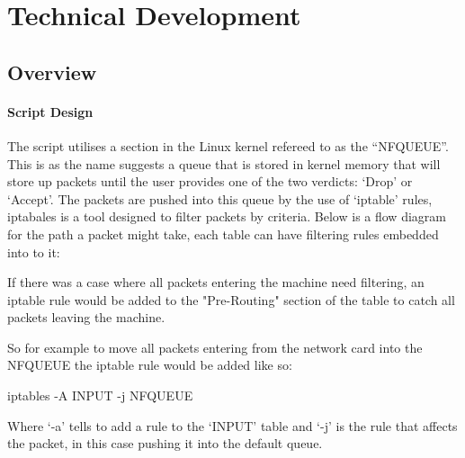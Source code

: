 \chapter{Technical Development}

\section{Overview}

\subsubsection{Script Design}
The script utilises a section in the Linux kernel refereed to as the ``NFQUEUE''. This is as the name suggests a queue that is stored in kernel memory that will store up packets until the user provides one of the two verdicts: `Drop' or `Accept'. The packets are pushed into this queue by the use of `iptable' rules, iptabales is a tool designed to filter packets by criteria. Below is a flow diagram for the path a packet might take, each table can have filtering rules embedded into to it:



If there was a case where all packets entering the machine need filtering, an iptable rule would be added to the "Pre-Routing" section of the table to catch all packets leaving the machine. 

So for example to move all packets entering from the network card into the NFQUEUE the iptable rule would be added like so:
\begin{center}
	\begin{console_font}
		\large{iptables -A INPUT -j NFQUEUE}
	\end{console_font} 
\end{center}
Where `-a' tells to add a rule to the `INPUT' table and `-j' is the rule that affects the packet, in this case pushing it into the default queue.


